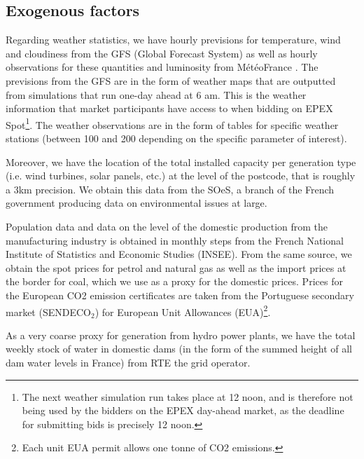 \subsection*{Exogenous factors}

Regarding weather statistics, we have hourly previsions for temperature, wind and cloudiness from the GFS (Global Forecast System) as well as hourly observations for these quantities and luminosity from M\'{e}t\'{e}oFrance
. The previsions from the GFS are in the form of weather maps that are outputted from simulations that run one-day ahead at 6 am. This is the weather information that market participants have access to when bidding on EPEX Spot\footnote{The next weather simulation run takes place at 12 noon, and is therefore not being used by the bidders on the EPEX day-ahead market, as the deadline for submitting bids is precisely 12 noon.}. The weather observations are in the form of tables for specific weather stations (between 100 and 200 depending on the specific parameter of interest).

Moreover, we have the location of the total installed capacity per generation type (i.e. wind turbines, solar panels, etc.) at the level of the postcode, that is roughly a 3km precision. We obtain this data from the SOeS, a branch of the French government producing data on environmental issues at large. 

Population data and data on the level of the domestic production from the manufacturing industry is obtained in monthly steps from the French National Institute of Statistics and Economic Studies (INSEE). From the same source, we obtain the spot prices for petrol and natural gas as well as the import prices at the border for coal, which we use as a proxy for the domestic prices. 
Prices for the European CO2 emission certificates are taken from the Portuguese secondary market (SENDECO$_2$) for European Unit Allowances (EUA)\footnote{Each unit EUA permit allows one tonne of CO2 emissions.}.

As a very coarse proxy for generation from hydro power plants, we have the total weekly stock of water in domestic dams (in the form of the summed height of all dam water levels in France) from RTE the grid operator.


